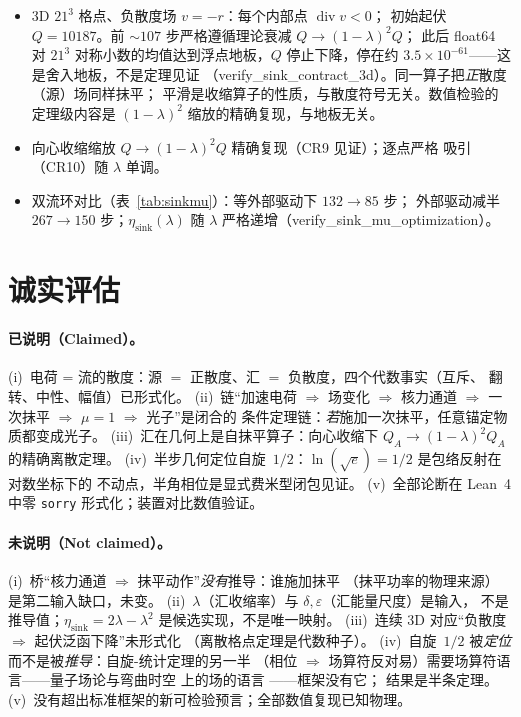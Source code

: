 \documentclass[aps,prd,preprint,superscriptaddress,amsmath,amssymb]{revtex4-2}
\begin{document}
\begin{itemize}
\item 3D $21^3$ 格点、负散度场 $v=-r$：每个内部点 $\operatorname{div} v<0$；
初始起伏 $Q=10187$。前 $\sim107$ 步严格遵循理论衰减 $Q\to(1-\lambda)^2 Q$；
此后 float64 对 $21^3$ 对称小数的均值达到浮点地板，$Q$ 停止下降，停在约
$3.5\times10^{-61}$——这是舍入地板，不是定理见证
（verify\_sink\_contract\_3d）。同一算子把\emph{正}散度（源）场同样抹平；
平滑是收缩算子的性质，与散度符号无关。数值检验的定理级内容是
$(1-\lambda)^2$ 缩放的精确复现，与地板无关。
\item 向心收缩缩放 $Q\to(1-\lambda)^2Q$ 精确复现（CR9 见证）；逐点严格
吸引（CR10）随 $\lambda$ 单调。
\item 双流环对比（表~\ref{tab:sinkmu}）：等外部驱动下 $132\to85$ 步；
外部驱动减半 $267\to150$ 步；$\eta_{\text{sink}}(\lambda)$ 随 $\lambda$
严格递增（verify\_sink\_mu\_optimization）。
\end{itemize}

\section{诚实评估}
\label{sec:honest}

\paragraph{已说明（Claimed）。}
(i)~电荷 = 流的散度：源 $=$ 正散度、汇 $=$ 负散度，四个代数事实（互斥、
翻转、中性、幅值）已形式化。
(ii)~链``加速电荷 $\Rightarrow$ 场变化 $\Rightarrow$ 核力通道
$\Rightarrow$ 一次抹平 $\Rightarrow$ $\mu=1$ $\Rightarrow$ 光子''是闭合的
条件定理链：\emph{若}施加一次抹平，任意锚定物质都变成光子。
(iii)~汇在几何上是自抹平算子：向心收缩下 $Q_A\to(1-\lambda)^2 Q_A$
的精确离散定理。
(iv)~半步几何定位自旋~$1/2$：$\ln(\sqrt e)=1/2$ 是包络反射在对数坐标下的
不动点，半角相位是显式费米型闭包见证。
(v)~全部论断在 Lean~4 中零 \texttt{sorry} 形式化；装置对比数值验证。

\paragraph{未说明（Not claimed）。}
(i)~桥``核力通道 $\Rightarrow$ 抹平动作''\emph{没有}推导：谁施加抹平
（抹平功率的物理来源）是第二输入缺口，未变。
(ii)~$\lambda$（汇收缩率）与 $\delta,\varepsilon$（汇能量尺度）是输入，
不是推导值；$\eta_{\text{sink}}=2\lambda-\lambda^2$ 是候选实现，不是唯一映射。
(iii)~连续 3D 对应``负散度 $\Rightarrow$ 起伏泛函下降''未形式化
（离散格点定理是代数种子）。
(iv)~自旋~$1/2$ 被\emph{定位}而不是被\emph{推导}：自旋-统计定理的另一半
（相位 $\Rightarrow$ 场算符反对易）需要场算符语言——量子场论与弯曲时空
上的场的语言 \cite{weinberg1995quantum,wald1994quantum}——框架没有它；
结果是半条定理。
(v)~没有超出标准框架的新可检验预言；全部数值复现已知物理。
\end{document}
